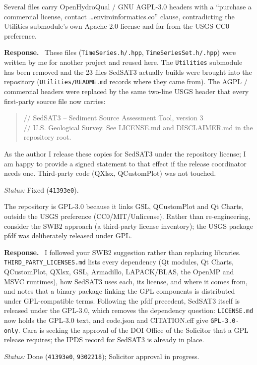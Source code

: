 \documentclass[11pt]{article}
\newcommand{\code}[1]{\texttt{#1}}
\newcommand{\commit}[1]{\texttt{#1}}
\newcounter{cmt}
\newcounter{grp}
\renewcommand{\thecmt}{\thegrp.\arabic{cmt}}
\newenvironment{reviewer}[1]{%
  \refstepcounter{cmt}%
  \begin{tcolorbox}[enhanced,breakable,colback=commentbg,colframe=usgsgreen!60,
    boxrule=0.4pt,left=6pt,right=6pt,top=4pt,bottom=4pt,
    title={\small\textbf{Comment \thecmt}\hfill\textit{#1}},
    coltitle=black,colbacktitle=usgsgreen!15,fonttitle=\small]}%
  {\end{tcolorbox}}
\newenvironment{response}{\par\noindent\textbf{Response.}\ }{\par\medskip}
\newcommand{\status}[1]{\par\noindent\textit{Status:} #1\par}
\begin{document}
\begin{reviewer}{Email 10/15; Summary, blocker 1}
Several files carry OpenHydroQual / GNU AGPL-3.0 headers with a ``purchase a
commercial license, contact \ldots enviroinformatics.co'' clause, contradicting
the Utilities submodule's own Apache-2.0 license and far from the USGS
CC0 preference.
\end{reviewer}
\begin{response}
These files (\code{TimeSeries.\allowbreak{}h/\allowbreak{}.\allowbreak{}hpp}, \code{TimeSeriesSet.\allowbreak{}h/\allowbreak{}.\allowbreak{}hpp}) were
written by me for another project and reused here. The \code{Utilities}
submodule has been removed and the 23 files SedSAT3 actually builds were
brought into the repository (\code{Utilities/\allowbreak{}README.\allowbreak{}md} records where they
came from). The AGPL / commercial headers were replaced by the same two-line
USGS header that every first-party source file now carries:
\begin{quote}\small\ttfamily
// SedSAT3 – Sediment Source Assessment Tool, version 3\\
// U.S. Geological Survey. See LICENSE.md and DISCLAIMER.md in the repository root.
\end{quote}
As the author I release these copies for SedSAT3 under the repository
license; I am happy to provide a signed statement to that effect if the
release coordinator needs one. Third-party code (QXlsx, QCustomPlot) was not
touched.
\end{response}
\status{Fixed (\commit{41393e0}).}

\begin{reviewer}{Email 10/15; Summary, blocker 2}
The repository is GPL-3.0 because it links GSL, QCustomPlot and Qt Charts,
outside the USGS preference (CC0/MIT/Unlicense). Rather than re-engineering,
consider the SWB2 approach (a third-party license inventory); the USGS
package pfdf was deliberately released under GPL.
\end{reviewer}
\begin{response}
I followed your SWB2 suggestion rather than replacing libraries.
\code{THIRD\_\allowbreak{}PARTY\_\allowbreak{}LICENSES.\allowbreak{}md} lists every dependency (Qt modules, Qt
Charts, QCustomPlot, QXlsx, GSL, Armadillo, LAPACK/BLAS, the OpenMP and MSVC
runtimes), how SedSAT3 uses each, its license, and where it comes from, and
notes that a binary package linking the GPL components is distributed under
GPL-compatible terms. Following the pfdf precedent, SedSAT3 itself is
released under the GPL-3.0, which removes the dependency question:
\code{LICENSE.\allowbreak{}md} now holds the GPL-3.0 text, and code.json and
CITATION.cff give \code{GPL-3.0-only}. Cara is seeking the approval of the DOI
Office of the Solicitor that a GPL release requires; the IPDS record for
SedSAT3 is already in place.
\end{response}
\status{Done (\commit{41393e0}, \commit{9302218}); Solicitor approval in progress.}
\end{document}
